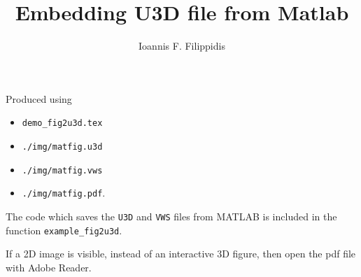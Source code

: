 \documentclass[a4paper]{article}
\begin{document}
\title{Embedding U3D file from Matlab}
\author{Ioannis F. Filippidis}
\maketitle


Produced using
\begin{itemize}
	\item \texttt{demo\_fig2u3d.tex}
	\item \texttt{./img/matfig.u3d}
	\item \texttt{./img/matfig.vws}
	\item \texttt{./img/matfig.pdf}.
\end{itemize}
The code which saves the \texttt{U3D} and \texttt{VWS} files from MATLAB is included in the function \texttt{example\_fig2u3d}.

If a 2D image is visible, instead of an interactive 3D figure, then open the pdf file with Adobe Reader.
\end{document}
